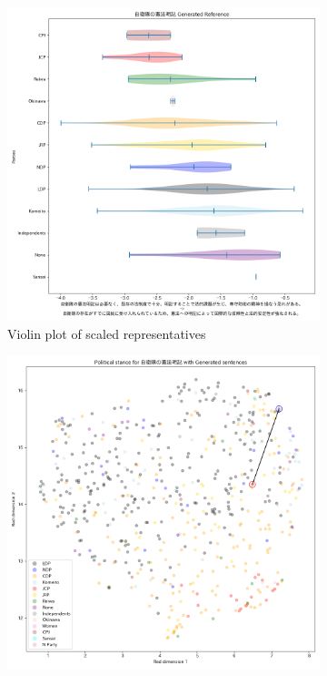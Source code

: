 \documentclass[final,5p,times,twocolumn,authoryear]{elsarticle}
\begin{document}
\begin{figure}[h]
\centering
    \begin{subfigure}{0.22\textwidth}
      \centering
      \includegraphics[width=1\linewidth]{figs/results/defence/constitution_gen_violin_plot.png}
      \caption{Violin plot of scaled representatives}
    \end{subfigure}
    \begin{subfigure}{0.22\textwidth}
      \centering
      \includegraphics[width=1\linewidth]{figs/results/defence/constitution_umap_gen.png}

\end{subfigure}
\end{figure}
\end{document}
